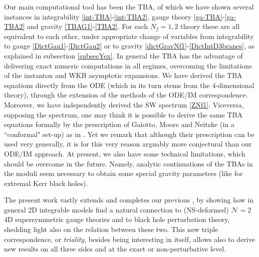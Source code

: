 \documentclass[11pt,a4paper]{elsarticle}
\numberwithin{figure}{section}
\numberwithin{table}{section}
\begin{document}
Our main computational tool has been the TBA, of which we have shown several instances in integrability \eqref{int-TBA}-\eqref{int-TBA2}, gauge theory \eqref{ga-TBA}-\eqref{ga-TBA2} and gravity  \eqref{TBAG1}-\eqref{TBA2}. For each $N_f=1,2$ theory these are all equivalent to each other, under appropriate change of variables from integrability to gauge \eqref{DictGau1}-\eqref{DictGau2} or to gravity \eqref{dictGravNf1}-\eqref{DictIntD3branes}, as explained in subsection \ref{subsecYex}. In general the TBA has the advantage of delivering exact numeric computations in all regimes, overcoming the limitations of the instanton and WKB asymptotic expansions. We have derived the TBA equations directly from the ODE (which in its turn stems from the 4-dimensional theory), through the extension of the methods of the ODE/IM correspondence. Moreover, we have independently derived the SW spectrum \eqref{ZNf1}. Viceversa, supposing the spectrum, one may think it is possible to derive %
the same TBA equations  formally by the prescription of Gaiotto, Moore and Neitzke (in a ``conformal" set-up) as in \cite{GaiottoMooreNeitzke:2008,GaiottoMooreNeitzke:2009,Chen:2010pk,GaiottoOpers,GrassiGuMarino}. Yet we remark that although their prescription can be used very generally, it is for this very reason arguably more conjectural than our ODE/IM approach. %
At present, we also have some technical limitations, which should be overcome in the future. Namely, analytic continuations of the TBAs in the moduli seem necessary to obtain some special gravity parameters (like for extremal Kerr black holes). 

The present work vastly extends and completes our previous \cite{FioravantiGregori:2019,FioravantiPoghossian:2019,FioravantiGregori:2021}, by showing how in general 2D integrable models find a natural connection to (NS-deformed) $\mathcal{N}=2$ 4D supersymmetric gauge theories and to black hole perturbation theory, shedding light also on the relation between these two. This new triple correspondence, or \textit{triality}, besides being interesting in itself, allows also to
derive new results on all three sides and at the exact or non-perturbative level. %
\end{document}
